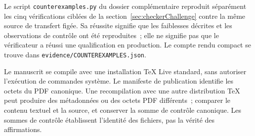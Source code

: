 \documentclass[11pt,a4paper]{article}
\newcommand{\chapterpage}{\clearpage}
\begin{document}
Le script \texttt{counterexamples.py} du dossier complémentaire reproduit séparément les cinq vérifications ciblées de la section~\ref{sec:checkerChallenge} contre la même source de transfert figée. Sa réussite signifie que les faiblesses décrites et les observations de contrôle ont été reproduites~; elle ne signifie pas que le vérificateur a réussi une qualification en production. Le compte rendu compact se trouve dans \texttt{evidence/COUNTEREXAMPLES.json}.

Le manuscrit se compile avec une installation TeX Live standard, sans autoriser l’exécution de commandes système. Le manifeste de publication identifie les octets du PDF canonique. Une recompilation avec une autre distribution TeX peut produire des métadonnées ou des octets PDF différents~; comparer le contenu textuel et la source, et conserver la somme de contrôle canonique. Les sommes de contrôle établissent l’identité des fichiers, pas la vérité des affirmations.

\chapterpage
\end{document}
